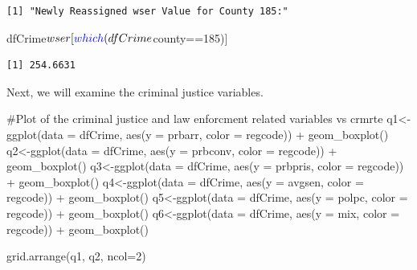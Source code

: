 \documentclass[]{article}
\newenvironment{Shaded}{}{}
\newcommand{\CommentTok}[1]{\textcolor[rgb]{0.00,0.50,0.00}{#1}}
\newcommand{\DataTypeTok}[1]{#1}
\newcommand{\DecValTok}[1]{#1}
\newcommand{\KeywordTok}[1]{\textcolor[rgb]{0.00,0.00,1.00}{#1}}
\newcommand{\NormalTok}[1]{#1}
\newcommand{\OperatorTok}[1]{#1}
\newcommand{\StringTok}[1]{\textcolor[rgb]{0.00,0.50,0.50}{#1}}
\begin{document}
\begin{verbatim}
[1] "Newly Reassigned wser Value for County 185:"
\end{verbatim}

\begin{Shaded}
\begin{Highlighting}[]
\NormalTok{dfCrime}\OperatorTok{$}\NormalTok{wser[}\KeywordTok{which}\NormalTok{(dfCrime}\OperatorTok{$}\NormalTok{county}\OperatorTok{==}\DecValTok{185}\NormalTok{)]}
\end{Highlighting}
\end{Shaded}

\begin{verbatim}
[1] 254.6631
\end{verbatim}

Next, we will examine the criminal justice variables.

\begin{Shaded}
\begin{Highlighting}[]
\CommentTok{#Plot of the criminal justice and law enforcment related variables vs crmrte}
\NormalTok{q1<-}\KeywordTok{ggplot}\NormalTok{(}\DataTypeTok{data =}\NormalTok{ dfCrime, }\KeywordTok{aes}\NormalTok{(}\DataTypeTok{y =}\NormalTok{ prbarr, }\DataTypeTok{color =}\NormalTok{ regcode)) }\OperatorTok{+}
\StringTok{      }\KeywordTok{geom_boxplot}\NormalTok{()}
\NormalTok{q2<-}\KeywordTok{ggplot}\NormalTok{(}\DataTypeTok{data =}\NormalTok{ dfCrime, }\KeywordTok{aes}\NormalTok{(}\DataTypeTok{y =}\NormalTok{ prbconv, }\DataTypeTok{color =}\NormalTok{ regcode)) }\OperatorTok{+}
\StringTok{      }\KeywordTok{geom_boxplot}\NormalTok{()}
\NormalTok{q3<-}\KeywordTok{ggplot}\NormalTok{(}\DataTypeTok{data =}\NormalTok{ dfCrime, }\KeywordTok{aes}\NormalTok{(}\DataTypeTok{y =}\NormalTok{ prbpris, }\DataTypeTok{color =}\NormalTok{ regcode)) }\OperatorTok{+}
\StringTok{      }\KeywordTok{geom_boxplot}\NormalTok{()}
\NormalTok{q4<-}\KeywordTok{ggplot}\NormalTok{(}\DataTypeTok{data =}\NormalTok{ dfCrime, }\KeywordTok{aes}\NormalTok{(}\DataTypeTok{y =}\NormalTok{ avgsen, }\DataTypeTok{color =}\NormalTok{ regcode)) }\OperatorTok{+}
\StringTok{      }\KeywordTok{geom_boxplot}\NormalTok{()}
\NormalTok{q5<-}\KeywordTok{ggplot}\NormalTok{(}\DataTypeTok{data =}\NormalTok{ dfCrime, }\KeywordTok{aes}\NormalTok{(}\DataTypeTok{y =}\NormalTok{ polpc, }\DataTypeTok{color =}\NormalTok{ regcode)) }\OperatorTok{+}
\StringTok{      }\KeywordTok{geom_boxplot}\NormalTok{()}
\NormalTok{q6<-}\KeywordTok{ggplot}\NormalTok{(}\DataTypeTok{data =}\NormalTok{ dfCrime, }\KeywordTok{aes}\NormalTok{(}\DataTypeTok{y =}\NormalTok{ mix, }\DataTypeTok{color =}\NormalTok{ regcode)) }\OperatorTok{+}
\StringTok{      }\KeywordTok{geom_boxplot}\NormalTok{()}

\KeywordTok{grid.arrange}\NormalTok{(q1, q2, }\DataTypeTok{ncol=}\DecValTok{2}\NormalTok{)}
\end{Highlighting}
\end{Shaded}
\end{document}
